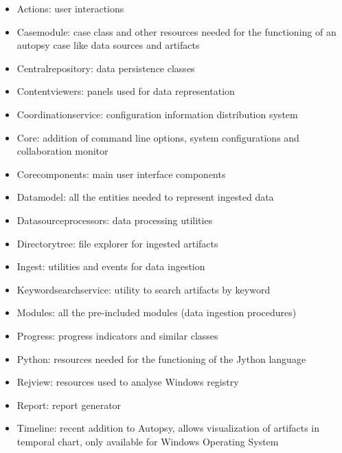 \begin{itemize}
 \item Actions: user interactions 
 \item Casemodule: case class and other resources needed for the functioning of an autopsy case like data sources and artifacts
 \item Centralrepository: data persistence classes 
 \item Contentviewers: panels used for data representation 
 \item Coordinationservice: configuration information distribution system
 \item Core: addition of command line options, system configurations and collaboration monitor 
 \item Corecomponents: main user interface components
 \item Datamodel: all the entities needed to represent ingested data
 \item Datasourceprocessors: data processing utilities 
 \item Directorytree: file explorer for ingested artifacts
 \item Ingest: utilities and events for data ingestion 
 \item Keywordsearchservice: utility to search artifacts by keyword 
 \item Modules: all the pre-included modules (data ingestion procedures)
 \item Progress: progress indicators and similar classes
 \item Python: resources needed for the functioning of the Jython language
 \item Rejview: resources used to analyse Windows registry
 \item Report: report generator
 \item Timeline: recent addition to Autopsy, allows visualization of artifacts in temporal chart, only available for Windows Operating System
\end{itemize}
